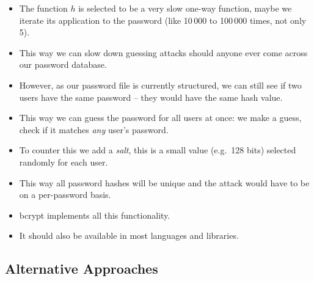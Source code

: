 \documentclass{beamer}
\begin{document}
\begin{frame}{\insertsubsectionhead}
  \begin{itemize}
    \item The function \(h\) is selected to be a very slow one-way function, 
      maybe we iterate its application to the password (like 10\,000 to 
      100\,000 times, not only 5).

    \item This way we can slow down guessing attacks should anyone ever come 
      across our password database.

    \item However, as our password file is currently structured, we can still 
      see if two users have the same password -- they would have the same hash 
      value.

    \item This way we can guess the password for all users at once: we make 
      a guess, check if it matches \emph{any} user's password.

    \item To counter this we add a \emph{salt}, this is a small value (e.g.\ 
      128 bits) selected randomly for each user.

    \item This way all password hashes will be unique and the attack would have 
      to be on a per-password basis.

  \end{itemize}
\end{frame}

\begin{frame}{\insertsubsectionhead}
  \begin{itemize}
    \item bcrypt implements all this functionality.
    \item It should also be available in most languages and libraries.
  \end{itemize}
\end{frame}

\subsection{Alternative Approaches}
\end{document}
